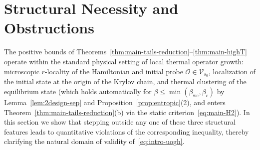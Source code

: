 \documentclass[11pt,a4paper]{article}
\numberwithin{equation}{section}
\theoremstyle{plain}
\theoremstyle{definition}
\begin{document}
\section{Structural Necessity and Obstructions}\label{sec:nogo}

The positive bounds of Theorems~\ref{thm:main-tails-reduction}--\ref{thm:main-highT} operate within the standard physical setting of local thermal operator growth: microscopic $r$-locality of the Hamiltonian and initial probe $\mathcal{O}\in\mathcal{V}_{s_0}$, localization of the initial state at the origin of the Krylov chain, and thermal clustering of the equilibrium state (which holds automatically for $\beta\le\min(\beta_{\mathrm{wc}},\beta_c)$ by Lemma~\ref{lem:2design-sep} and Proposition~\ref{prop:entropic}(2), and enters Theorem~\ref{thm:main-tails-reduction}(b) via the static criterion~\eqref{eq:main-H2}). In this section we show that stepping outside any one of these three structural features leads to quantitative violations of the corresponding inequality, thereby clarifying the natural domain of validity of~\eqref{eq:intro-uogh}.
\end{document}
